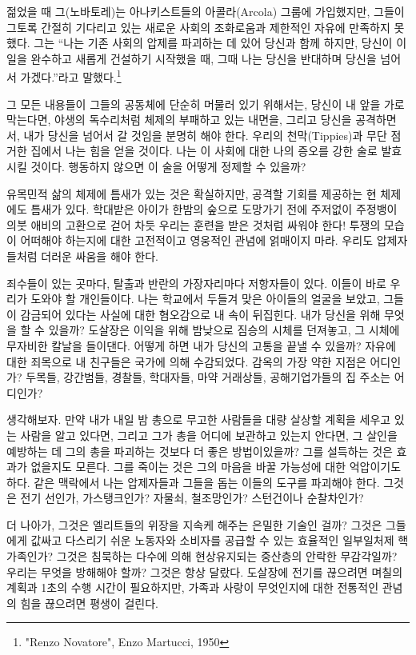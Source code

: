 \documentclass[11pt, b6paper, openany]{memoir}
\begin{document}
\begin{article}
    젊었을 때 그(노바토레)는 아나키스트들의 아콜라(Arcola) 그룹에 가입했지만, 그들이 그토록 간절히 기다리고 있는 새로운 사회의 조화로움과 제한적인 자유에 만족하지 못했다. 그는 “나는 기존 사회의 압제를 파괴하는 데 있어 당신과 함께 하지만, 당신이 이 일을 완수하고 새롭게 건설하기 시작했을 때, 그때 나는 당신을 반대하며 당신을 넘어서 가겠다.”라고 말했다.\footnote{"Renzo Novatore", Enzo Martucci, 1950}

그 모든 내용들이 그들의 공동체에 단순히 머물러 있기 위해서는, 당신이 내 앞을 가로막는다면, 야생의 독수리처럼 체제의 부패하고 있는 내면을, 그리고 당신을 공격하면서, 내가 당신을 넘어서 갈 것임을 분명히 해야 한다. 우리의 천막(Tippies)과 무단 점거한 집에서 나는 힘을 얻을 것이다. 나는 이 사회에 대한 나의 증오를 강한 술로 발효시킬 것이다. 행동하지 않으면 이 술을 어떻게 정제할 수 있을까? 

유목민적 삶의 체제에 틈새가 있는 것은 확실하지만, 공격할 기회를 제공하는 현 체제에도 틈새가 있다. 학대받은 아이가 한밤의 숲으로 도망가기 전에 주저없이 주정뱅이 의붓 애비의 고환으로 걷어 차듯 우리는 훈련을 받은 것처럼 싸워야 한다! 투쟁의 모습이 어떠해야 하는지에 대한 고전적이고 영웅적인 관념에 얽매이지 마라. 우리도 압제자들처럼 더러운 싸움을 해야 한다. 

죄수들이 있는 곳마다, 탈출과 반란의 가장자리마다 저항자들이 있다. 이들이 바로 우리가 도와야 할 개인들이다. 나는 학교에서 두들겨 맞은 아이들의 얼굴을 보았고, 그들이 감금되어 있다는 사실에 대한 혐오감으로 내 속이 뒤집힌다. 내가 당신을 위해 무엇을 할 수 있을까? 도살장은 이익을 위해 밤낮으로 짐승의 시체를 던져놓고, 그 시체에 무자비한 칼날을 들이댄다. 어떻게 하면 내가 당신의 고통을 끝낼 수 있을까? 자유에 대한 죄목으로 내 친구들은 국가에 의해 수감되었다. 감옥의 가장 약한 지점은 어디인가? 두목들, 강간범들, 경찰들, 학대자들, 마약 거래상들, 공해기업가들의 집 주소는 어디인가?

생각해보자. 만약 내가 내일 밤 총으로 무고한 사람들을 대량 살상할 계획을 세우고 있는 사람을 알고 있다면, 그리고 그가 총을 어디에 보관하고 있는지 안다면, 그 살인을 예방하는 데 그의 총을 파괴하는 것보다 더 좋은 방법이있을까? 그를 설득하는 것은 효과가 없을지도 모른다. 그를 죽이는 것은 그의 마음을 바꿀 가능성에 대한 억압이기도 하다. 같은 맥락에서 나는 압제자들과 그들을 돕는 이들의 도구를 파괴해야 한다. 그것은 전기 선인가, 가스탱크인가? 자물쇠, 철조망인가? 스턴건이나 순찰차인가?  

더 나아가, 그것은 엘리트들의 위장을 지속케 해주는 은밀한 기술인 걸까? 그것은 그들에게 값싸고 다스리기 쉬운 노동자와 소비자를 공급할 수 있는 효율적인 일부일처제 핵가족인가? 그것은 침묵하는 다수에 의해 현상유지되는 중산층의 안락한  무감각일까? 우리는 무엇을 방해해야 할까? 그것은 항상 달랐다. 도살장에 전기를 끊으려면 며칠의 계획과 1초의 수행 시간이 필요하지만, 가족과 사랑이 무엇인지에 대한 전통적인 관념의 힘을 끊으려면 평생이 걸린다. 


\end{article}
\end{document}
